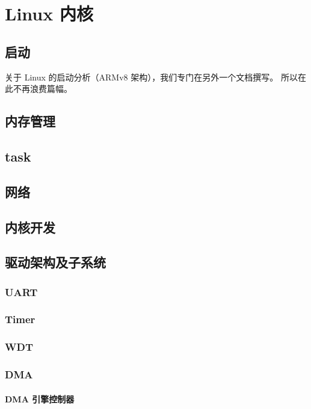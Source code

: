 \section{Linux 内核}

\subsection{启动}

关于 Linux 的启动分析（ARMv8 架构），我们专门在另外一个文档撰写。
所以在此不再浪费篇幅。

\subsection{内存管理}

\subsection{task}

\subsection{网络}

\subsection{内核开发}

\subsection{驱动架构及子系统}
\subsubsection{UART}

\subsubsection{Timer}

\subsubsection{WDT}

\subsubsection{DMA}

\paragraph{DMA 引擎控制器}

